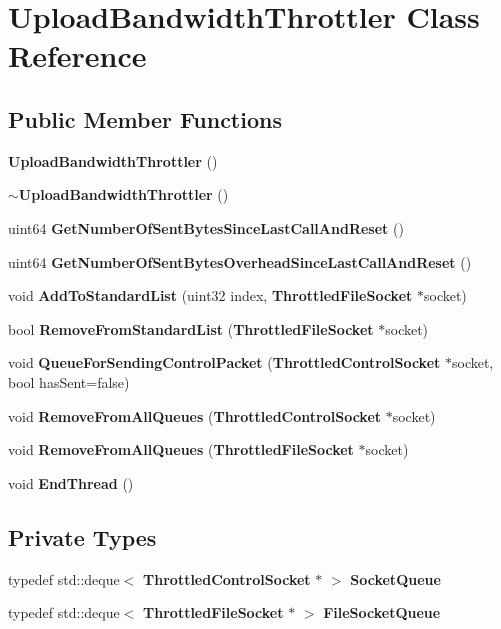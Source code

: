 \section{UploadBandwidthThrottler Class Reference}
\label{classUploadBandwidthThrottler}
\subsection*{Public Member Functions}
\begin{DoxyCompactItemize}
\item 
{\bf UploadBandwidthThrottler} ()\label{classUploadBandwidthThrottler_a667521c30c433daaf47bd2ad8dea9a88}

\item 
{\bf $\sim$UploadBandwidthThrottler} ()
\item 
uint64 {\bf GetNumberOfSentBytesSinceLastCallAndReset} ()
\item 
uint64 {\bf GetNumberOfSentBytesOverheadSinceLastCallAndReset} ()
\item 
void {\bf AddToStandardList} (uint32 index, {\bf ThrottledFileSocket} $\ast$socket)
\item 
bool {\bf RemoveFromStandardList} ({\bf ThrottledFileSocket} $\ast$socket)
\item 
void {\bf QueueForSendingControlPacket} ({\bf ThrottledControlSocket} $\ast$socket, bool hasSent=false)
\item 
void {\bfseries RemoveFromAllQueues} ({\bf ThrottledControlSocket} $\ast$socket)\label{classUploadBandwidthThrottler_a328a79e551604bb9b8b3c6503d953010}

\item 
void {\bfseries RemoveFromAllQueues} ({\bf ThrottledFileSocket} $\ast$socket)\label{classUploadBandwidthThrottler_a6c872c671a3584dd29909cb3f48a8867}

\item 
void {\bf EndThread} ()
\end{DoxyCompactItemize}
\subsection*{Private Types}
\begin{DoxyCompactItemize}
\item 
typedef std::deque$<$ {\bf ThrottledControlSocket} $\ast$ $>$ {\bfseries SocketQueue}\label{classUploadBandwidthThrottler_ad5b10e225c648bd9ed0b93423aba6bc7}

\item 
typedef std::deque$<$ {\bf ThrottledFileSocket} $\ast$ $>$ {\bfseries FileSocketQueue}\label{classUploadBandwidthThrottler_a65ccadc0751bebd916140b0071da70c6}

\end{DoxyCompactItemize}
